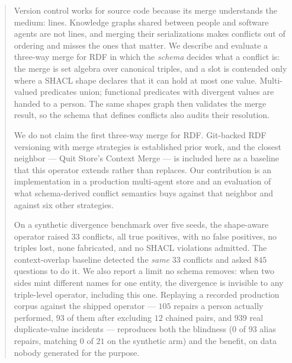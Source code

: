 \begin{abstract}
Version control works for source code because its merge understands the medium:
lines. Knowledge graphs shared between people and software agents are not lines,
and merging their serializations makes conflicts out of ordering and misses the
ones that matter. We describe and evaluate a three-way merge for RDF in which
the \emph{schema} decides what a conflict is: the merge is set algebra over
canonical triples, and a slot is contended only where a SHACL shape declares
that it can hold at most one value. Multi-valued predicates union; functional
predicates with divergent values are handed to a person. The same shapes graph
then validates the merge result, so the schema that defines conflicts also
audits their resolution.

We do not claim the first three-way merge for RDF. Git-backed RDF versioning
with merge strategies is established prior work, and the closest neighbor ---
Quit Store's Context Merge --- is included here as a baseline that this operator
extends rather than replaces. Our contribution is an implementation in a
production multi-agent store and an evaluation of what schema-derived conflict
semantics buys against that neighbor and against six other strategies.

On a synthetic divergence benchmark over five seeds, the shape-aware operator
raised $33$ conflicts, all true positives, with no false positives, no triples
lost, none fabricated, and no SHACL violations admitted. The context-overlap
baseline detected the \emph{same} $33$ conflicts and asked $845$ questions to do
it. We also report a limit no schema removes: when two sides mint different
names for one entity, the divergence is invisible to any triple-level operator,
including this one. Replaying a recorded production corpus against the shipped
operator --- $105$ repairs a person actually performed, $93$ of them after
excluding $12$ chained pairs, and $939$ real duplicate-value incidents ---
reproduces both the blindness ($0$ of $93$ alias repairs, matching $0$ of $21$
on the synthetic arm) and the benefit, on data nobody generated for the
purpose.
\end{abstract}

